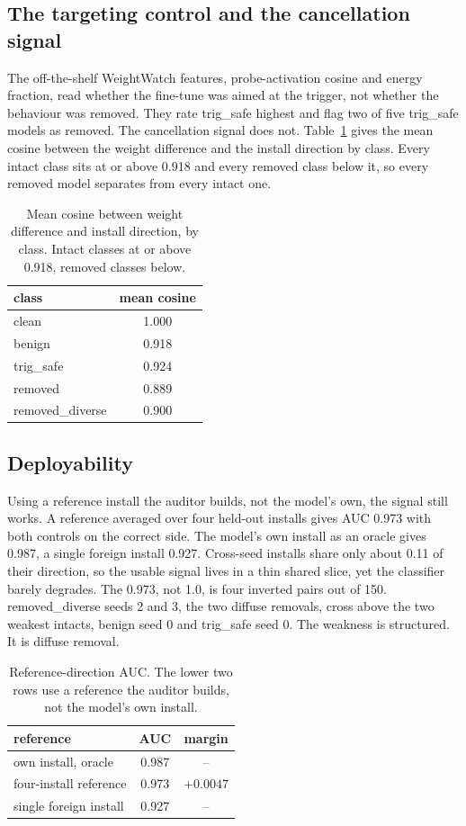 \documentclass[11pt]{article}
\begin{document}
\subsection{The targeting control and the cancellation signal}
The off-the-shelf WeightWatch features, probe-activation cosine and energy
fraction, read whether the fine-tune was aimed at the trigger, not whether the
behaviour was removed. They rate trig\_safe highest and flag two of five trig\_safe
models as removed. The cancellation signal does not. Table~\ref{tab:cosine} gives
the mean cosine between the weight difference and the install direction by class.
Every intact class sits at or above 0.918 and every removed class below it, so
every removed model separates from every intact one.

\begin{table}[ht]
\centering
\caption{Mean cosine between weight difference and install direction, by class.
Intact classes at or above 0.918, removed classes below.}
\label{tab:cosine}
\begin{tabular}{lc}
\toprule
class & mean cosine \\
\midrule
clean & 1.000 \\
benign & 0.918 \\
trig\_safe & 0.924 \\
removed & 0.889 \\
removed\_diverse & 0.900 \\
\bottomrule
\end{tabular}
\end{table}

\subsection{Deployability}
Using a reference install the auditor builds, not the model's own, the signal still
works. A reference averaged over four held-out installs gives AUC 0.973 with both
controls on the correct side. The model's own install as an oracle gives 0.987, a
single foreign install 0.927. Cross-seed installs share only about 0.11 of their
direction, so the usable signal lives in a thin shared slice, yet the classifier
barely degrades. The 0.973, not 1.0, is four inverted pairs out of 150.
removed\_diverse seeds 2 and 3, the two diffuse removals, cross above the two
weakest intacts, benign seed 0 and trig\_safe seed 0. The weakness is structured.
It is diffuse removal.

\begin{table}[ht]
\centering
\caption{Reference-direction AUC. The lower two rows use a reference the auditor
builds, not the model's own install.}
\label{tab:refauc}
\begin{tabular}{lcc}
\toprule
reference & AUC & margin \\
\midrule
own install, oracle & 0.987 & -- \\
four-install reference & 0.973 & $+0.0047$ \\
single foreign install & 0.927 & -- \\
\bottomrule
\end{tabular}
\end{table}
\end{document}
